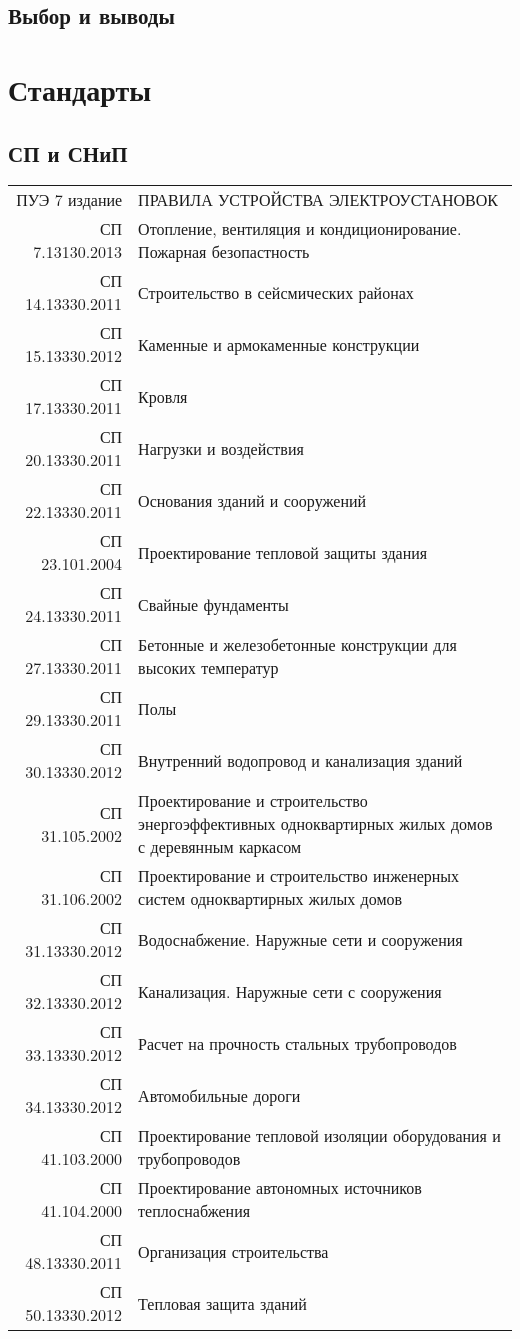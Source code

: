 \documentclass[12pt, twocolumn]{report}
\begin{document}
\chapter{Выбор и выводы}

\part{Стандарты}

\chapter{СП и СНиП}

\begin{tabular}{rp{14cm}}
ПУЭ 7 издание    & ПРАВИЛА УСТРОЙСТВА ЭЛЕКТРОУСТАНОВОК \\
СП 7.13130.2013  & Отопление, вентиляция и кондиционирование. Пожарная безопастность \\
СП 14.13330.2011 & Строительство в сейсмических районах \\
СП 15.13330.2012 & Каменные и армокаменные конструкции \\
СП 17.13330.2011 & Кровля \\
СП 20.13330.2011 & Нагрузки и воздействия \\
СП 22.13330.2011 & Основания зданий и сооружений \\
СП 23.101.2004   & Проектирование тепловой защиты здания \\
СП 24.13330.2011 & Свайные фундаменты \\
СП 27.13330.2011 & Бетонные и железобетонные конструкции для высоких температур \\
СП 29.13330.2011 & Полы \\
СП 30.13330.2012 & Внутренний водопровод и канализация зданий \\
СП 31.105.2002   & Проектирование и строительство энергоэффективных одноквартирных жилых домов с деревянным каркасом \\
СП 31.106.2002   & Проектирование и строительство инженерных систем одноквартирных жилых домов \\
СП 31.13330.2012 & Водоснабжение. Наружные сети и сооружения \\
СП 32.13330.2012 & Канализация. Наружные сети с сооружения \\
СП 33.13330.2012 & Расчет на прочность стальных трубопроводов \\
СП 34.13330.2012 & Автомобильные дороги \\
СП 41.103.2000   & Проектирование тепловой изоляции оборудования и трубопроводов \\
СП 41.104.2000   & Проектирование автономных источников теплоснабжения \\
СП 48.13330.2011 & Организация строительства \\
СП 50.13330.2012 & Тепловая защита зданий \\
\end{tabular}
\end{document}
